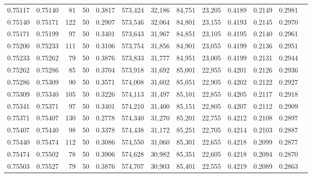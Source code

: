 \begin{tabular}{rrrrrrrrrrrrr}
0.75117 & 0.75140 &    81 &  50 &                                     0.3817 & 573,424 &  32,186 &  84,751 &  23,205 & 0.4189 & 0.2149 & 0.2981 \\
0.75140 & 0.75171 &   122 &  50 &                                     0.2907 & 573,546 &  32,064 &  84,801 &  23,155 & 0.4193 & 0.2145 & 0.2970 \\
0.75171 & 0.75199 &    97 &  50 &                                     0.3401 & 573,643 &  31,967 &  84,851 &  23,105 & 0.4195 & 0.2140 & 0.2961 \\
0.75200 & 0.75233 &   111 &  50 &                                     0.3106 & 573,754 &  31,856 &  84,901 &  23,055 & 0.4199 & 0.2136 & 0.2951 \\
0.75233 & 0.75262 &    79 &  50 &                                     0.3876 & 573,833 &  31,777 &  84,951 &  23,005 & 0.4199 & 0.2131 & 0.2944 \\
0.75262 & 0.75286 &    85 &  50 &                                     0.3704 & 573,918 &  31,692 &  85,001 &  22,955 & 0.4201 & 0.2126 & 0.2936 \\
0.75286 & 0.75309 &    90 &  50 &                                     0.3571 & 574,008 &  31,602 &  85,051 &  22,905 & 0.4202 & 0.2122 & 0.2927 \\
0.75309 & 0.75340 &   105 &  50 &                                     0.3226 & 574,113 &  31,497 &  85,101 &  22,855 & 0.4205 & 0.2117 & 0.2918 \\
0.75341 & 0.75371 &    97 &  50 &                                     0.3401 & 574,210 &  31,400 &  85,151 &  22,805 & 0.4207 & 0.2112 & 0.2909 \\
0.75371 & 0.75407 &   130 &  50 &                                     0.2778 & 574,340 &  31,270 &  85,201 &  22,755 & 0.4212 & 0.2108 & 0.2897 \\
0.75407 & 0.75440 &    98 &  50 &                                     0.3378 & 574,438 &  31,172 &  85,251 &  22,705 & 0.4214 & 0.2103 & 0.2887 \\
0.75440 & 0.75474 &   112 &  50 &                                     0.3086 & 574,550 &  31,060 &  85,301 &  22,655 & 0.4218 & 0.2099 & 0.2877 \\
0.75474 & 0.75502 &    78 &  50 &                                     0.3906 & 574,628 &  30,982 &  85,351 &  22,605 & 0.4218 & 0.2094 & 0.2870 \\
0.75503 & 0.75527 &    79 &  50 &                                     0.3876 & 574,707 &  30,903 &  85,401 &  22,555 & 0.4219 & 0.2089 & 0.2863 \\

\end{tabular}
